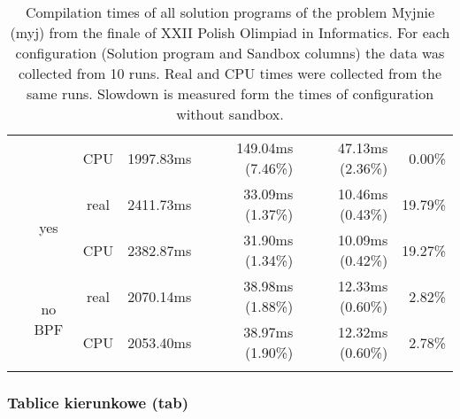 \documentclass[en]{pracamgr}
\begin{document}
\begin{small}
\begin{longtable}{|l|c|c|r|r|r|r|}
                            &                         & CPU  & 1997.83ms & 149.04ms (7.46\%) & 47.13ms (2.36\%) & 0.00\% \\*
                            \cline{2-7}
                            & \multirow{2}{*}{yes}    & real & 2411.73ms & 33.09ms (1.37\%) & 10.46ms (0.43\%) & 19.79\% \\*
                            &                         & CPU  & 2382.87ms & 31.90ms (1.34\%) & 10.09ms (0.42\%) & 19.27\% \\*
                            \cline{2-7}
                            & \multirow{2}{*}{no BPF} & real & 2070.14ms & 38.98ms (1.88\%) & 12.33ms (0.60\%) & 2.82\% \\*
                            &                         & CPU  & 2053.40ms & 38.97ms (1.90\%) & 12.32ms (0.60\%) & 2.78\% \\
\hline
\caption{Compilation times of all solution programs of the problem Myjnie (myj) from the finale of XXII Polish Olimpiad in Informatics. For each configuration (Solution program and Sandbox columns) the data was collected from 10 runs. Real and CPU times were collected from the same runs. Slowdown is measured form the times of configuration without sandbox.}
\label{table:myj_compilation}
\end{longtable}
\end{small}

\subsubsection{Tablice kierunkowe (tab)}
\end{document}
